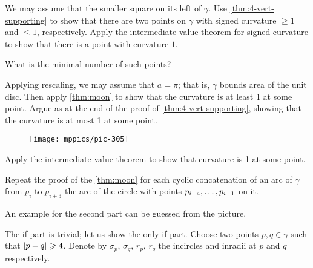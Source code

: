 \begin{multicols}{2}
We may assume that the smaller square on its left of $\gamma$.
Use \ref{thm:4-vert-supporting} to show that there are two points on $\gamma$ with signed curvature $\ge 1$ and $\le 1$, respectively.
Apply the intermediate value theorem for signed curvature to show that there is a point with curvature $1$.

 What is the minimal number of such points?

Applying rescaling, we may assume that $a=\pi$; that is, $\gamma$ bounds area of the unit disc.
Then apply \ref{thm:moon} to show that the curvature is at least 1 at some point.
Argue as at the end of the proof of \ref{thm:4-vert-supporting}, showing that the curvature is at most 1 at some point.

\begin{wrapfigure}{r}{20 mm}
\vskip-6mm
\centering
\texttt{[image: mppics/pic-305]}
\vskip-2mm
\end{wrapfigure}


Apply the intermediate value theorem to show that curvature is  1 at some point.

Repeat the proof of the \ref{thm:moon} for each cyclic concatenation of an arc of $\gamma$ from $p_i$ to $p_{i+3}$ the arc of the circle with points $p_{i+4},\z\dots,p_{i-1}$ on it.

An example for the second part can be guessed from the picture.





The if part is trivial; let us show the only-if part.
Choose two points $p,q\in\gamma$ such that $\dist{p}{q}{}\ge 4$.
Denote by $\sigma_p$, $\sigma_q$, $r_p$, $r_q$ the incircles and inradii at $p$ and $q$ respectively.


\end{multicols}

